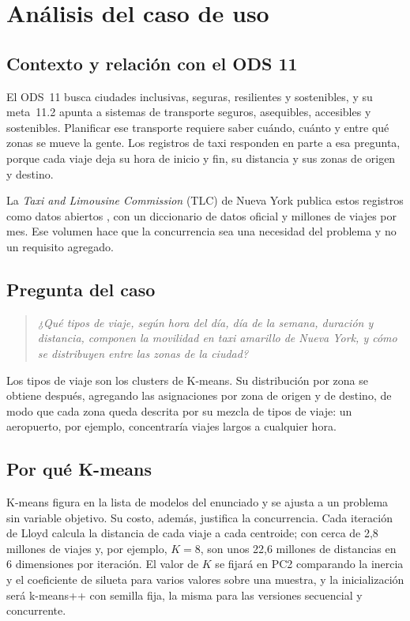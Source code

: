\section{Análisis del caso de uso}\label{sec:caso}

\subsection{Contexto y relación con el ODS 11}

El ODS~11 busca ciudades inclusivas, seguras, resilientes y sostenibles, y su meta~11.2 apunta a
sistemas de transporte seguros, asequibles, accesibles y sostenibles. Planificar ese transporte
requiere saber cuándo, cuánto y entre qué zonas se mueve la gente. Los registros de taxi responden
en parte a esa pregunta, porque cada viaje deja su hora de inicio y fin, su distancia y sus zonas
de origen y destino.

La \textit{Taxi and Limousine Commission} (TLC) de Nueva York publica estos registros como datos
abiertos \parencite{nyctlc}, con un diccionario de datos oficial y millones de viajes por mes. Ese
volumen hace que la concurrencia sea una necesidad del problema y no un requisito agregado.

\subsection{Pregunta del caso}

\begin{quote}
\textit{¿Qué tipos de viaje, según hora del día, día de la semana, duración y distancia, componen la
movilidad en taxi amarillo de Nueva York, y cómo se distribuyen entre las zonas de la ciudad?}
\end{quote}

Los tipos de viaje son los clusters de K-means. Su distribución por zona se obtiene después,
agregando las asignaciones por zona de origen y de destino, de modo que cada zona queda descrita
por su mezcla de tipos de viaje: un aeropuerto, por ejemplo, concentraría viajes largos a cualquier
hora.

\subsection{Por qué K-means}

K-means figura en la lista de modelos del enunciado y se ajusta a un problema sin variable objetivo.
Su costo, además, justifica la concurrencia. Cada iteración de Lloyd calcula la distancia de cada
viaje a cada centroide; con cerca de 2,8 millones de viajes y, por ejemplo, $K = 8$, son unos 22,6
millones de distancias en 6 dimensiones por iteración. El valor de $K$ se fijará en PC2
comparando la inercia y el coeficiente de silueta para varios valores sobre una muestra, y la
inicialización será k-means++ con semilla fija, la misma para las versiones secuencial y concurrente.

